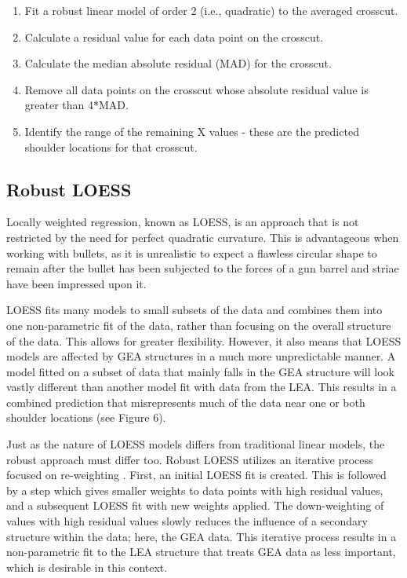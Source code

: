 \documentclass[]{article}
\begin{document}
\begin{enumerate}
\item Fit a robust linear model of order 2 (i.e., quadratic) to the averaged crosscut.   
\item Calculate a residual value for each data point on the crosscut.  
\item Calculate the median absolute residual (MAD) for the crosscut.  
\item Remove all data points on the crosscut whose absolute residual value is greater than 4*MAD.  
\item Identify the range of the remaining X values - these are the predicted shoulder locations for that crosscut.   
\end{enumerate}

\subsection{Robust LOESS}

Locally weighted regression, known as LOESS, is an approach that is not
restricted by the need for perfect quadratic curvature. This is
advantageous when working with bullets, as it is unrealistic to expect a
flawless circular shape to remain after the bullet has been subjected to
the forces of a gun barrel and striae have been impressed upon it.

LOESS fits many models to small subsets of the data and combines them
into one non-parametric fit of the data, rather than focusing on the
overall structure of the data. This allows for greater flexibility.
However, it also means that LOESS models are affected by GEA structures
in a much more unpredictable manner. A model fitted on a subset of data
that mainly falls in the GEA structure will look vastly different than
another model fit with data from the LEA. This results in a combined
prediction that misrepresents much of the data near one or both shoulder
locations (see Figure 6).

Just as the nature of LOESS models differs from traditional linear
models, the robust approach must differ too. Robust LOESS utilizes an
iterative process focused on re-weighting \citep[see][]{Cleveland1}.
First, an initial LOESS fit is created. This is followed by a step which
gives smaller weights to data points with high residual values, and a
subsequent LOESS fit with new weights applied. The down-weighting of
values with high residual values slowly reduces the influence of a
secondary structure within the data; here, the GEA data. This iterative
process results in a non-parametric fit to the LEA structure that treats
GEA data as less important, which is desirable in this context.
\end{document}
